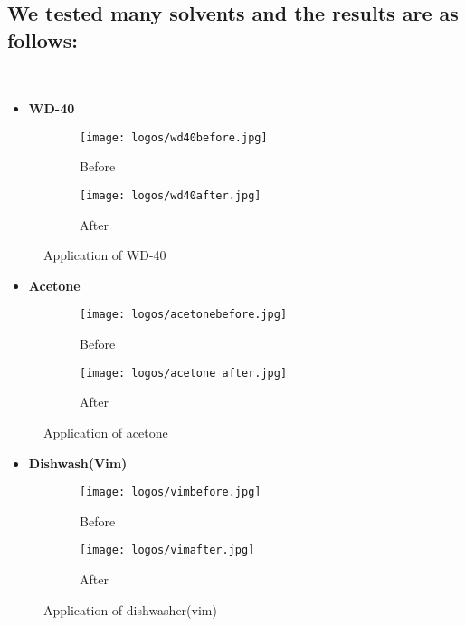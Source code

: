 \documentclass[table]{rapportCS}
\begin{document}
\subsection{We tested many solvents and the results are as follows:}
\
\begin{itemize}[label=$\bullet$]
        \item \textbf{WD-40} 
    \end{itemize}
\begin{figure}[h]
    \centering
    \begin{subfigure}{0.265\textwidth}
        \centering
        \texttt{[image: logos/wd40before.jpg]}
        \caption{Before}
    \end{subfigure}\hspace{0.1\textwidth}%
    \begin{subfigure}{0.265\textwidth}
        \centering
        \texttt{[image: logos/wd40after.jpg]}
        \caption{After}
    \end{subfigure}
    \caption{Application of WD-40}
\end{figure}
\clearpage
\begin{itemize}[label=$\bullet$]
        \item \textbf{Acetone} 
    \end{itemize}
\begin{figure}[h]
    \centering
    \begin{subfigure}{0.2\textwidth}
        \centering
        \texttt{[image: logos/acetonebefore.jpg]}
        \caption{Before}
    \end{subfigure}\hspace{0.1\textwidth}%
    \begin{subfigure}{0.2\textwidth}
        \centering
        \texttt{[image: logos/acetone after.jpg]}
        \caption{After}
    \end{subfigure}
    \caption{Application of acetone}
\end{figure}
\begin{itemize}[label=$\bullet$]
        \item \textbf{Dishwash(Vim)} 
    \end{itemize}
\begin{figure}[h]
    \centering
    \begin{subfigure}{0.2\textwidth}
        \centering
        \texttt{[image: logos/vimbefore.jpg]}
        \caption{Before}
    \end{subfigure}\hspace{0.1\textwidth}%
    \begin{subfigure}{0.2\textwidth}
        \centering
        \texttt{[image: logos/vimafter.jpg]}
        \caption{After}
    \end{subfigure}
    \caption{Application of dishwasher(vim)}
\end{figure}
\end{document}

